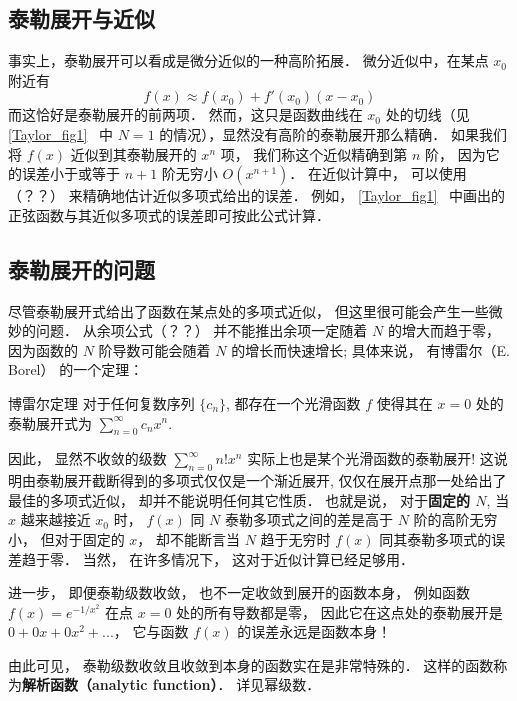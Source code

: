 
\begin{issues}
\end{issues}



\subsection{泰勒展开与近似}
事实上，泰勒展开可以看成是微分近似的一种高阶拓展． 微分近似中，在某点 $x_0$ 附近有
\begin{equation}
f(x) \approx f(x_0) + f'(x_0)(x - x_0)
\end{equation}
而这恰好是泰勒展开的前两项． 然而，这只是函数曲线在 $x_0$ 处的切线（见\autoref{Taylor_fig1}~ 中 $N=1$ 的情况），显然没有高阶的泰勒展开那么精确． 如果我们将 $f(x)$ 近似到其泰勒展开的 $x^n$ 项， 我们称这个近似精确到第 $n$ 阶， 因为它的误差小于或等于 $n + 1$ 阶无穷小 $O(x^{n + 1})$． 在近似计算中， 可以使用（？？） 来精确地估计近似多项式给出的误差． 例如， \autoref{Taylor_fig1}~ 中画出的正弦函数与其近似多项式的误差即可按此公式计算．

\subsection{泰勒展开的问题}
尽管泰勒展开式给出了函数在某点处的多项式近似， 但这里很可能会产生一些微妙的问题． 从余项公式（？？） 并不能推出余项一定随着 $N$ 的增大而趋于零， 因为函数的 $N$ 阶导数可能会随着 $N$ 的增长而快速增长; 具体来说， 有博雷尔（E. Borel） 的一个定理：
\begin{theorem}{博雷尔定理}
对于任何复数序列 $\{c_n\}$, 都存在一个光滑函数 $f$ 使得其在 $x=0$ 处的泰勒展开式为 $\sum_{n=0}^\infty c_nx^n$.
\end{theorem}
因此， 显然不收敛的级数 $\sum_{n=0}^\infty n!x^n$ 实际上也是某个光滑函数的泰勒展开! 这说明由泰勒展开截断得到的多项式仅仅是一个渐近展开, 仅仅在展开点那一处给出了最佳的多项式近似， 却并不能说明任何其它性质． 也就是说， 对于\textbf{固定的 $N$}, 当 $x$ 越来越接近 $x_0$ 时， $f(x)$ 同 $N$ 泰勒多项式之间的差是高于 $N$ 阶的高阶无穷小， 但对于固定的 $x$， 却不能断言当 $N$ 趋于无穷时 $f(x)$ 同其泰勒多项式的误差趋于零． 当然， 在许多情况下， 这对于近似计算已经足够用．

进一步， 即便泰勒级数收敛， 也不一定收敛到展开的函数本身， 例如函数 $f(x)=e^{-1/x^2}$ 在点 $x=0$ 处的所有导数都是零， 因此它在这点处的泰勒展开是 $0+0x+0x^2+...$， 它与函数 $f(x)$ 的误差永远是函数本身！

由此可见， 泰勒级数收敛且收敛到本身的函数实在是非常特殊的． 这样的函数称为\textbf{解析函数（analytic function）}． 详见幂级数．

